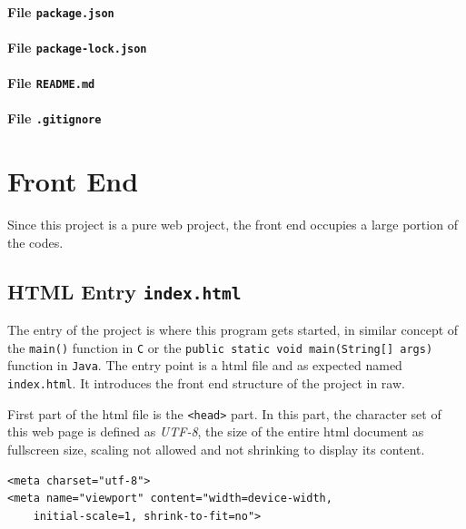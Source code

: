 \paragraph{File \texttt{package.json}}

\paragraph{File \texttt{package-lock.json}}

\paragraph{File \texttt{README.md}}

\paragraph{File \texttt{.gitignore}}



\section{Front End}

Since this project is a pure web project, the front end occupies a large portion of the codes.

\subsection{HTML Entry \texttt{index.html}}

The entry of the project is where this program gets started, in similar concept of the \texttt{main()} function in \texttt{C} or the \texttt{public static void main(String[] args)} function in \texttt{Java}. The entry point is a \gls{html} file and as expected named \texttt{index.html}. It introduces the front end structure of the project in raw.

First part of the \gls{html} file is the \texttt{<head>} part. In this part, the character set of this web page is defined as \emph{UTF-8}, the size of the entire \gls{html} document as fullscreen size, scaling not allowed and not shrinking to display its content.

\begin{verbatim}
<meta charset="utf-8">
<meta name="viewport" content="width=device-width,
    initial-scale=1, shrink-to-fit=no">
\end{verbatim}

